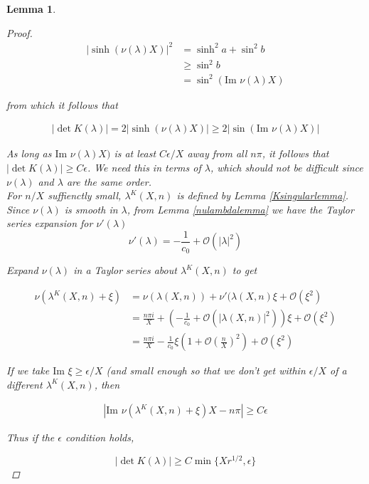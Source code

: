 \documentclass[12pt]{article}
\newtheorem{lemma}{Lemma}
\begin{document}
\begin{lemma}
\begin{proof}
\begin{align*}
|\sinh(\nu(\lambda) X)|^2 
&= \sinh^2 a + \sin^2 b \\
&\geq \sin^2 b \\
&= \sin^2 (\text{Im }\nu(\lambda)X)
\end{align*}

from which it follows that

\begin{align*}
|\det K(\lambda)| = 2 |\sinh(\nu(\lambda) X)| \geq 2|\sin(\text{Im }\nu(\lambda)X)|
\end{align*}

As long as $\text{Im }\nu(\lambda)X)$ is at least $C \epsilon/X$ away from all $n \pi$, it follows that $|\det K(\lambda)| \geq C \epsilon$. We need this in terms of $\lambda$, which should not be difficult since $\nu(\lambda)$ and $\lambda$ are the same order.\\

For $n/X$ suffienctly small, $\lambda^K(X, n)$ is defined by Lemma \ref{Ksingularlemma}. Since $\nu(\lambda)$ is smooth in $\lambda$, from Lemma \ref{nulambdalemma} we have the Taylor series expansion for $\nu'(\lambda)$
\[
\nu'(\lambda) = -\frac{1}{c_0} + \mathcal{O}(|\lambda|^2)
\]

Expand $\nu(\lambda)$ in a Taylor series about $\lambda^K(X, n)$ to get

\begin{align*}
\nu\left( \lambda^K(X, n) + \xi \right) &= \nu( \lambda(X, n) ) + \nu'(\lambda(X, n)\xi
+ \mathcal{O}(\xi^2) \\
&= \frac{n \pi i}{X} + \left( -\frac{1}{c_0} + \mathcal{O}(|\lambda(X, n)|^2) \right) \xi
+ \mathcal{O}(\xi^2) \\
&= \frac{n \pi i}{X} -\frac{1}{c_0}\xi \left( 1 + \mathcal{O} \left(\frac{n}{X}\right)^2 \right) + \mathcal{O}(\xi^2)
\end{align*}

If we take $\text{Im } \xi \geq \epsilon/X$ (and small enough so that we don't get within $\epsilon/X$ of a different $\lambda^K(X, n)$, then

\begin{align*}
|\text{Im } \nu\left( \lambda^K(X, n) + \xi \right)X - n \pi| \geq C \epsilon
\end{align*}

Thus if the $\epsilon$ condition holds,

\[
|\det K(\lambda)| \geq C \min\{ X r^{1/2}, \epsilon \}
\]

\end{proof}
\end{lemma}
\end{document}
